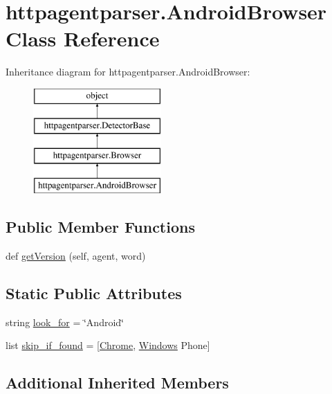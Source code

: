\hypertarget{classhttpagentparser_1_1_android_browser}{}\section{httpagentparser.\+Android\+Browser Class Reference}
\label{classhttpagentparser_1_1_android_browser}
Inheritance diagram for httpagentparser.\+Android\+Browser\+:\begin{figure}[H]
\begin{center}
\leavevmode
\includegraphics[height=4.000000cm]{classhttpagentparser_1_1_android_browser}
\end{center}
\end{figure}
\subsection*{Public Member Functions}
\begin{DoxyCompactItemize}
\item 
def \hyperlink{classhttpagentparser_1_1_android_browser_a7b62bb8b7b556f15999ca06e2aa0e33f}{get\+Version} (self, agent, word)
\end{DoxyCompactItemize}
\subsection*{Static Public Attributes}
\begin{DoxyCompactItemize}
\item 
string \hyperlink{classhttpagentparser_1_1_android_browser_a5a0029db816b0e4fe11effa4f5cb6751}{look\+\_\+for} = \char`\"{}Android\char`\"{}
\item 
list \hyperlink{classhttpagentparser_1_1_android_browser_ab4efff681835586292f1d846b169f07b}{skip\+\_\+if\+\_\+found} = \mbox{[}\textquotesingle{}\hyperlink{classhttpagentparser_1_1_chrome}{Chrome}\textquotesingle{}, \textquotesingle{}\hyperlink{classhttpagentparser_1_1_windows}{Windows} Phone\textquotesingle{}\mbox{]}
\end{DoxyCompactItemize}
\subsection*{Additional Inherited Members}


